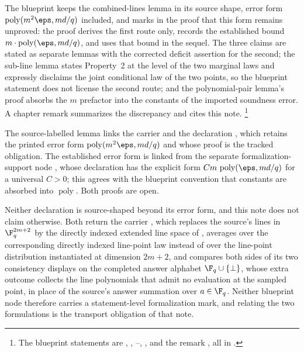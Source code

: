 \documentclass[11pt]{article}
\DeclareMathOperator{\poly}{poly}
\begin{document}
The blueprint \cite{MIPStarREBlueprint} keeps the combined-lines lemma in
its source shape, error form $\poly(m^2\eps, md/q)$ included, and marks in
the proof that this form remains unproved: the proof derives the first route
only, records the established bound $m \cdot \poly(\eps, md/q)$, and uses
that bound in the sequel.  The
three claims are stated as separate lemmas with the corrected deficit
assertion for the second; the sub-line lemma states Property~2 at the
level of the two marginal laws and expressly disclaims the joint
conditional law of the two points, so the blueprint statement does not
license the second route; and the polynomial-pair lemma's proof absorbs
the $m$ prefactor into the constants of the imported soundness error.  A
chapter remark summarizes the discrepancy and cites this note.%
\footnote{The blueprint statements are ,
, --,
, and the remark
, all in
.}

The source-labelled lemma links the carrier
 and the declaration
, which retains the printed error form
$\poly(m^2\eps,md/q)$ and whose proof is the tracked obligation.  The
established error form is linked from the separate formalization-support node
, whose declaration
 has the explicit form
$C m\,\poly(\eps,md/q)$ for a universal $C>0$; this agrees with the blueprint
convention that constants are absorbed into $\poly$.  Both proofs are open.

Neither declaration is source-shaped beyond its error form, and this note does
not claim otherwise.  Both return the carrier ,
which replaces the source's lines in $\F_q^{2m+2}$ by the directly indexed
extended line space of
, averages over the
corresponding directly indexed line-point law instead of over the line-point
distribution instantiated at dimension $2m+2$, and compares both sides of its
two consistency displays on the completed answer alphabet
$\F_q\cup\{\bot\}$, whose extra outcome collects the line polynomials that
admit no evaluation at the sampled point, in place of the source's answer
summation over $a\in\F_q$.  Neither blueprint node therefore carries a
statement-level formalization mark, and relating the two formulations is the
transport obligation of that note.
\end{document}
